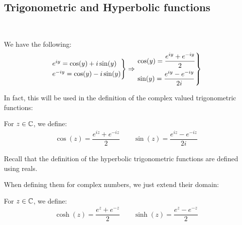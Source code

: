 \subsection{Trigonometric and Hyperbolic functions}\hfill\\\par
\noindent We have the following:
\begin{equation*}
  \begin{gathered}
    \begin{rcases}
      e^{iy} = \cos(y)+i\sin(y)\\
      e^{-iy} = \cos(y)-i\sin(y)
    \end{rcases}\Rightarrow
    \begin{rcases*}
      \cos(y) = \dfrac{e^{iy}+e^{-iy}}{2}\\
      \sin(y) = \dfrac{e^{iy}-e^{-iy}}{2i}
    \end{rcases*}
  \end{gathered}
\end{equation*}
\par\bigskip
\noindent In fact, this will be used in the definition of the complex valued trigonometric functions:
\par\bigskip
\begin{theo}{}
  For $z\in\mathbb{C}$, we define:
  \begin{equation*}
    \begin{gathered}
      \cos(z) = \dfrac{e^{iz}+e^{-iz}}{2}\qquad\sin(z) = \dfrac{e^{iz}-e^{-iz}}{2i}
    \end{gathered}
  \end{equation*}
  \par\bigskip
\end{theo}
\par\bigskip
\noindent Recall that the definition of the hyperbolic trigonometric functions are defined using reals.\par
\noindent When defining them for complex numbers, we just extend their domain:
\par\bigskip
\begin{theo}{}
  For $z\in\mathbb{C}$, we define:
  \begin{equation*}
    \begin{gathered}
      \cosh(z) = \dfrac{e^z+e^{-z}}{2}\qquad\sinh(z) = \dfrac{e^z-e^{-z}}{2}
    \end{gathered}
  \end{equation*}
\end{theo}

